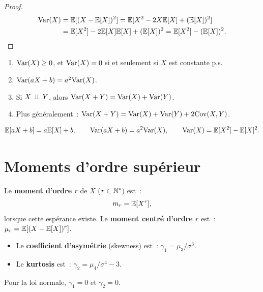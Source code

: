\begin{proof}
\begin{align*}
    \mathrm{Var}(X) &= \mathbb{E}[(X - \mathbb{E}[X])^2]
    = \mathbb{E}[X^2 - 2X\mathbb{E}[X] + (\mathbb{E}[X])^2] \\
    &= \mathbb{E}[X^2] - 2\mathbb{E}[X]\mathbb{E}[X] + (\mathbb{E}[X])^2
    = \mathbb{E}[X^2] - (\mathbb{E}[X])^2. \qedhere
\end{align*}
\end{proof}

\begin{proposition}
\begin{enumerate}[label=(\roman*)]
    \item $\mathrm{Var}(X) \geq 0$, et $\mathrm{Var}(X) = 0$ si et seulement si $X$ est constante p.s.
    \item $\mathrm{Var}(aX + b) = a^2 \mathrm{Var}(X)$.
    \item Si $X \perp\!\!\!\perp Y$, alors $\mathrm{Var}(X + Y) = \mathrm{Var}(X) + \mathrm{Var}(Y)$.
    \item Plus g\'en\'eralement~: $\mathrm{Var}(X + Y) = \mathrm{Var}(X) + \mathrm{Var}(Y) + 2\mathrm{Cov}(X,Y)$.
\end{enumerate}
\end{proposition}

\begin{formules}[title=\textbf{R\'esum\'e : esp\'erance et variance}]
\[
    \mathbb{E}[aX+b] = a\mathbb{E}[X]+b, \qquad \mathrm{Var}(aX+b) = a^2\mathrm{Var}(X), \qquad
    \mathrm{Var}(X) = \mathbb{E}[X^2] - \mathbb{E}[X]^2.
\]
\end{formules}

\section{Moments d'ordre sup\'erieur}

\begin{definition}
Le \textbf{moment d'ordre $r$} de $X$ ($r \in \mathbb{N}^*$) est~:
\[
    m_r = \mathbb{E}[X^r],
\]
lorsque cette esp\'erance existe. Le \textbf{moment centr\'e d'ordre $r$} est~:
$\mu_r = \mathbb{E}[(X - \mathbb{E}[X])^r]$.
\end{definition}

\begin{definition}
\begin{itemize}
    \item Le \textbf{coefficient d'asym\'etrie} (skewness) est~:
    $\gamma_1 = \mu_3 / \sigma^3$.
    \item Le \textbf{kurtosis} est~:
    $\gamma_2 = \mu_4 / \sigma^4 - 3$.
\end{itemize}
Pour la loi normale, $\gamma_1 = 0$ et $\gamma_2 = 0$.
\end{definition}

